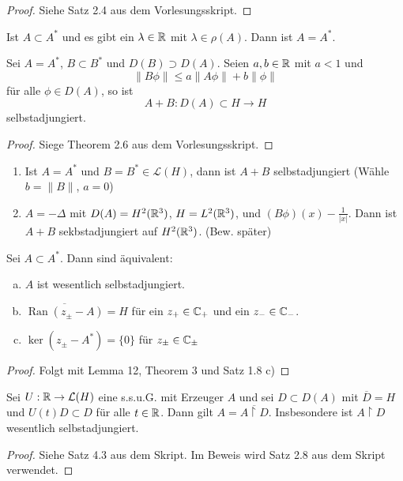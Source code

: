 \documentclass{mycourse}
\newcommand{\Ran}{\operatorname{Ran}}
\begin{document}
\begin{proof}
Siehe Satz 2.4 aus dem Vorlesungsskript.
\end{proof}
\begin{kor}
Ist $A\subset A^*$ und es gibt ein $\lambda \in \mathbb{R}$ mit $\lambda \in\rho(A)$. Dann ist $A=A^*$.
\end{kor}
\begin{st}
Sei $A=A^*$, $B\subset B^*$ und $D(B) \supset D(A)$. Seien $a,b\in \mathbb{R}$ mit $a<1$ und
\[
\|B\phi\| \le a \| A\phi\| + b \| \phi \|
\]
für alle $\phi \in D(A)$, so ist
\[
A+B: D(A) \subset H  \to H
\]
selbstadjungiert.
\end{st}
\begin{proof}
Siege Theorem 2.6 aus dem Vorlesungsskript.
\end{proof}

\begin{ex*}
\begin{enumerate}[1)]
\item Ist $A=A^*$ und $B=B^*\in \mathcal L(H)$, dann ist $A+B$ selbstadjungiert (Wähle $b=\| B\|$, $a=0$)
\item $A=-\Delta$ mit $D(A) = H^2(\mathbb{R}^3)$, $H=L^2(\mathbb{R}^3)$, und $(B\phi)(x) -\frac{1}{|x|}$. Dann ist $A+B$ sekbstadjungiert auf $H^2(\mathbb{R}^3)$. (Bew. später)
\end{enumerate}
\end{ex*}







\setcounter{thm}{13}
\begin{st}
Sei $A\subset A^*$. Dann sind äquivalent:
\begin{enumerate}[a)]
\item $A$ ist wesentlich selbstadjungiert.
\item $\overline{\Ran(z_\pm -A)}=H$ für ein $z_+\in \mathbb{C}_+$ und ein $z_-\in \mathbb{C}_-$.
\item $\ker(z_\pm - A^*)= \{0\}$ für $z_\pm \in \mathbb{C}_\pm$
\end{enumerate}
\end{st}
\begin{proof}
Folgt mit Lemma 12, Theorem 3 und Satz 1.8 c)
\end{proof}

\begin{st}[Nelson]
Sei $U: \mathbb{R} \to \mathcal L(H)$ eine s.s.u.G. mit Erzeuger $A$ und sei $D\subset D(A)$ mit $\overline{D}=H$ und $U(t)D\subset D$ für alle $t\in \mathbb{R}$. Dann gilt $A=\overline{A \upharpoonright D}$. Insbesondere ist $A\upharpoonright D$ wesentlich selbstadjungiert.
\end{st}
\begin{proof}
Siehe Satz 4.3 aus dem Skript. Im Beweis wird Satz 2.8 aus dem Skript verwendet. 
\end{proof}
\end{document}
